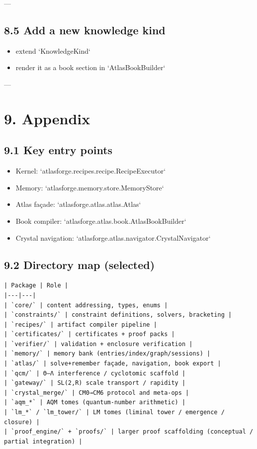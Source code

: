 \documentclass[11pt]{article}
\begin{document}
---

\subsection{8.5 Add a new knowledge kind}
\begin{itemize}
\item extend `KnowledgeKind`
\item render it as a book section in `AtlasBookBuilder`
\end{itemize}

---

\section{9. Appendix}

\subsection{9.1 Key entry points}

\begin{itemize}
\item Kernel: `atlasforge.recipes.recipe.RecipeExecutor`
\item Memory: `atlasforge.memory.store.MemoryStore`
\item Atlas façade: `atlasforge.atlas.atlas.Atlas`
\item Book compiler: `atlasforge.atlas.book.AtlasBookBuilder`
\item Crystal navigation: `atlasforge.atlas.navigator.CrystalNavigator`
\end{itemize}

\subsection{9.2 Directory map (selected)}

\begin{lstlisting}
| Package | Role |
|---|---|
| `core/` | content addressing, types, enums |
| `constraints/` | constraint definitions, solvers, bracketing |
| `recipes/` | artifact compiler pipeline |
| `certificates/` | certificates + proof packs |
| `verifier/` | validation + enclosure verification |
| `memory/` | memory bank (entries/index/graph/sessions) |
| `atlas/` | solve+remember façade, navigation, book export |
| `qcm/` | Θ–Λ interference / cyclotomic scaffold |
| `gateway/` | SL(2,R) scale transport / rapidity |
| `crystal_merge/` | CM0→CM6 protocol and meta-ops |
| `aqm_*` | AQM tomes (quantum-number arithmetic) |
| `lm_*` / `lm_tower/` | LM tomes (liminal tower / emergence / closure) |
| `proof_engine/` + `proofs/` | larger proof scaffolding (conceptual / partial integration) |
\end{lstlisting}
\end{document}
